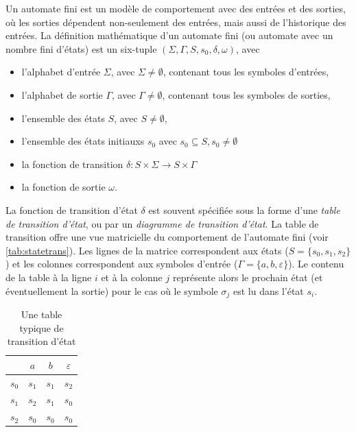 \documentclass[a4paper,12pt,BCOR=6mm,bibtotoc,idxtotoc]{scrbook}
\begin{document}
Un automate fini \cite{automata} est un mod\`ele de comportement avec
des entr\'ees et des sorties, o\`u les sorties d\'ependent non-seulement des
entr\'ees, mais aussi de l'historique des entr\'ees.  La d\'efinition
math\'ematique d'un automate fini (ou automate avec un nombre fini
d'\'etats) est un six-tuple $(\Sigma, \Gamma, S, s_0, \delta, \omega)$,
avec

\begin{itemize}
\item l'alphabet d'entr\'ee $\Sigma$, avec $\Sigma \neq
  \emptyset$, contenant tous les symboles d'entr\'ees,
\item l'alphabet de sortie $\Gamma$, avec $\Gamma \neq
  \emptyset$, contenant tous les symboles de sorties,
\item l'ensemble des \'etats $S$, avec $S \neq \emptyset$,
\item l'ensemble des \'etats initiauxs $s_0$ avec
  $s_0 \subseteq S, s_0 \neq \emptyset$
\item la fonction de transition
  $\delta: S \times \Sigma \rightarrow S \times \Gamma$
\item la fonction de sortie $\omega$.
\end{itemize}

La fonction de transition d'\'etat $\delta$ est souvent sp\'ecifi\'ee
sous la forme d'une \textit{table de transition d'\'etat}, ou par un
\textit{diagramme de transition d'\'etat}.  La table de transition
offre une vue matricielle du comportement de l'automate fini (voir
\autoref{tab:statetrans}).  Les lignes de la matrice correspondent aux
\'etats ($S = \{s_0, s_1, s_2\}$) et les colonnes correspondent aux
symboles d'entr\'ee ($\Gamma = \{a, b, \varepsilon\}$).  Le contenu de
la table \`a la ligne $i$ et \`a la colonne $j$ repr\'esente alors le
prochain \'etat (et \'eventuellement la sortie) pour le cas o\`u le
symbole $\sigma_j$ est lu dans l'\'etat $s_i$.

\begin{table}[htbp]
  \caption{Une table typique de transition d'\'etat}
  \label{tab:statetrans}
  \vspace{2mm}
  \centering
  \begin{tabular}{l|ccc}
    & $a$ & $b$ & $\varepsilon$\\ \hline
    $s_0$ & $s_1$ & $s_1$ & $s_2$\\
    $s_1$ & $s_2$ & $s_1$ & $s_0$\\
    $s_2$ & $s_0$ & $s_0$ & $s_0$\\ \hline
  \end{tabular}
\end{table}
\end{document}
